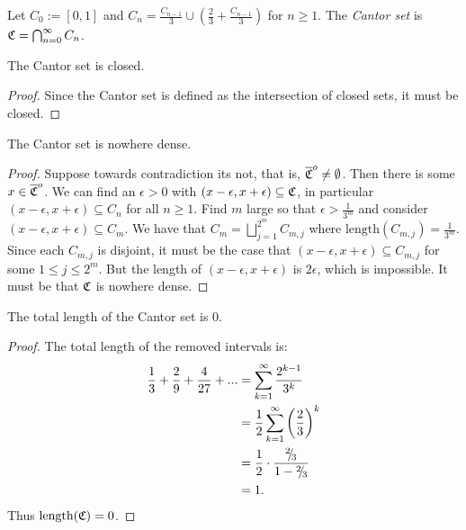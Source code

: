     \begin{definition}
        Let $C_0 := [0,1]$ and $C_n = \frac{C_{n-1}}{3} \cup \left( \frac{2}{3} + \frac{C_{n-1}}{3}\right)$ for $n \geq 1$. The \textit{Cantor set} is $\mathfrak{C} = \bigcap_{n = 0}^\infty C_n$.
    \end{definition}

    \begin{proposition}
        The Cantor set is closed.
    \end{proposition}
        \begin{proof}
            Since the Cantor set is defined as the intersection of closed sets, it must be closed.
        \end{proof}

    \begin{proposition}
        The Cantor set is nowhere dense.
    \end{proposition}
        \begin{proof}
            Suppose towards contradiction its not, that is, $\overline{\mathfrak{C}}^o \neq \emptyset$. Then there is some $x \in \overline{\mathfrak{C}}^o$. We can find an $\epsilon > 0$ with $(x- \epsilon, x+\epsilon) \subseteq \mathfrak{C}$, in particular $(x- \epsilon, x+\epsilon) \subseteq C_n$ for all $n \geq 1$. Find $m$ large so that $\epsilon > \frac{1}{3^m}$ and consider $(x-\epsilon,x+\epsilon) \subseteq C_m$. We have that $C_m = \bigsqcup_{j = 1}^{2^m}C_{m,j}$ where $\text{length}(C_{m,j}) = \frac{1}{3^m}$. Since each $C_{m,j}$ is disjoint, it must be the case that $(x-\epsilon,x+\epsilon) \subseteq C_{m,j}$ for some $1 \leq j \leq 2^m$. But the length of $(x-\epsilon,x+\epsilon)$ is $2\epsilon$, which is impossible. It must be that $\mathfrak{C}$ is nowhere dense.
        \end{proof}
    
    \begin{proposition}
        The total length of the Cantor set is $0$.
    \end{proposition}
        \begin{proof}
            The total length of the removed intervals is:
                \begin{equation*}
                \begin{split}
                    \frac{1}{3} + \frac{2}{9} + \frac{4}{27} + ... 
                    & = \sum_{k=1}^\infty \frac{2^{k-1}}{3^k} \\
                    & = \frac{1}{2} \sum_{k=1}^\infty \left( \frac{2}{3} \right)^k \\
                    & = \frac{1}{2} \cdot \frac{{}^{2}\mskip -5mu/\mskip -3mu_{3}}{1 - {}^{2}\mskip -5mu/\mskip -3mu_{3}} \\
                    & = 1.
                \end{split}
                \end{equation*}
            Thus $\text{length}(\mathfrak{C}) = 0$.
        \end{proof}

